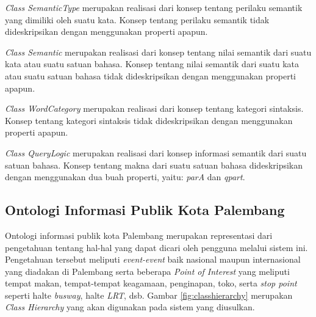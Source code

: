 	\emph{Class SemanticType} merupakan realisasi dari konsep tentang perilaku semantik yang dimiliki oleh suatu kata. Konsep tentang perilaku semantik tidak dideskripsikan dengan menggunakan properti apapun.
	
	\emph{Class Semantic} merupakan realisasi dari konsep tentang nilai semantik dari suatu kata atau suatu satuan bahasa. Konsep tentang nilai semantik dari suatu kata atau suatu satuan bahasa tidak dideskripsikan dengan menggunakan properti apapun.
	
	\emph{Class WordCategory} merupakan realisasi dari konsep tentang kategori sintaksis. Konsep tentang kategori sintaksis tidak dideskripsikan dengan menggunakan properti apapun.
	
	\emph{Class QueryLogic} merupakan realisasi dari konsep informasi semantik dari suatu satuan bahasa. Konsep tentang makna dari suatu satuan bahasa dideskripsikan dengan menggunakan dua buah properti, yaitu: \emph{parA} dan \emph{qpart}. 
	
	\subsection{Ontologi Informasi Publik Kota Palembang}
	Ontologi informasi publik kota Palembang merupakan representasi dari pengetahuan tentang hal-hal yang dapat dicari oleh pengguna melalui sistem ini. Pengetahuan tersebut meliputi \emph{event-event} baik nasional maupun internasional yang diadakan di Palembang serta beberapa \emph{Point of Interest} yang meliputi tempat makan, tempat-tempat keagamaan, penginapan, toko, serta \emph{stop point} seperti halte \emph{busway}, halte \emph{LRT}, dsb. Gambar \ref{fig:classhierarchy} merupakan \emph{Class Hierarchy} yang akan digunakan pada sistem yang diusulkan.
	
